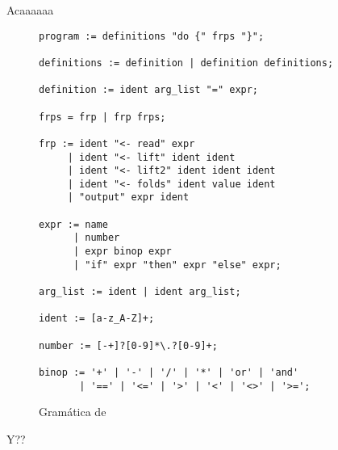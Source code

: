 Acaaaaaa

\begin{figure}
  \begin{center}
    \caption{Gramática de \frob{}}
    \begin{Verbatim}[frame=single]
program := definitions "do {" frps "}";

definitions := definition | definition definitions;

definition := ident arg_list "=" expr;

frps = frp | frp frps;

frp := ident "<- read" expr
     | ident "<- lift" ident ident
     | ident "<- lift2" ident ident ident
     | ident "<- folds" ident value ident
     | "output" expr ident

expr := name
      | number
      | expr binop expr
      | "if" expr "then" expr "else" expr;

arg_list := ident | ident arg_list;

ident := [a-z_A-Z]+;

number := [-+]?[0-9]*\.?[0-9]+;

binop := '+' | '-' | '/' | '*' | 'or' | 'and'
       | '==' | '<=' | '>' | '<' | '<>' | '>=';
     \end{Verbatim}
   \label{fig:grammar}
   \end{center}
 \end{figure}

 Y??
